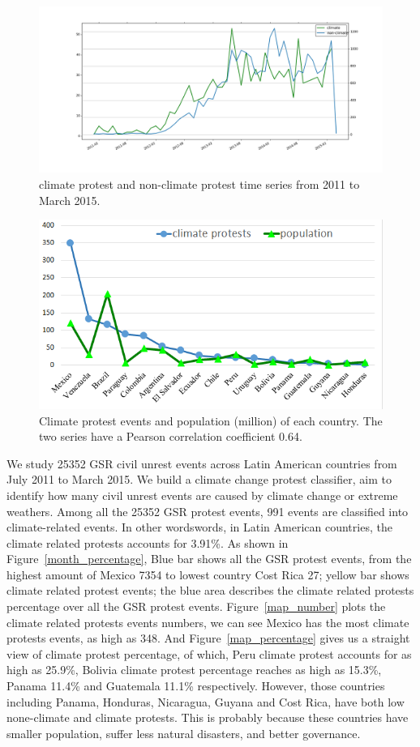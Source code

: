 \documentclass[9pt,twocolumn,twoside]{pnas-new}
\begin{document}
\begin{figure}[ht]
\centerline
{\includegraphics[width=.5\textwidth]{figures/protest_time_series.png}}
\caption{climate protest and non-climate protest time series from 2011 to March 2015.}
\label{protest_time_series}
\end{figure}


\begin{figure}[ht]
\centerline
{\includegraphics[width=.4\textwidth]{figures/protest-population}}
\caption{Climate protest events and population (million) of each country. The two series have a Pearson correlation coefficient 0.64.}
\label{protest-population}
\end{figure}


We study 25352 GSR civil unrest events across Latin American countries from July 2011 to March 2015. We build a climate change protest classifier, aim to identify how many civil unrest events are caused by climate change or extreme weathers. Among all the 25352 GSR protest events,  991 events are classified into climate-related events. In other wordswords, in Latin American countries, the climate related protests accounts for 3.91\%. As shown in Figure~\ref{month_percentage}, Blue bar shows all the GSR protest events, from the highest amount of Mexico 7354 to lowest country Cost Rica 27; yellow bar shows climate related protest events; the blue area describes the climate related protests percentage over all the GSR protest events. Figure~\ref{map_number} plots the climate related protests events numbers, we can see Mexico has the most climate protests events, as high as 348. And Figure~\ref{map_percentage} gives us a straight view of climate protest percentage, of which, Peru climate protest accounts for as high as 25.9\%, Bolivia climate protest percentage reaches as high as 15.3\%, Panama 11.4\% and Guatemala 11.1\% respectively. However, those countries including Panama, Honduras, Nicaragua, Guyana and Cost Rica, have both low none-climate and climate protests. This is probably because these countries have smaller population, suffer less natural disasters, and better governance.
\end{document}
